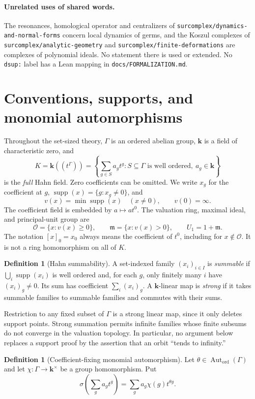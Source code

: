 \documentclass[11pt,oneside]{article}
\numberwithin{equation}{section}
\theoremstyle{definition}
\newtheorem{definition}[theorem]{Definition}
\theoremstyle{remark}
\newcommand{\kk}{\mathbf k}
\newcommand{\OO}{\mathcal O}
\newcommand{\mm}{\mathfrak m}
\newcommand{\supp}{\operatorname{supp}}
\newcommand{\Aut}{\operatorname{Aut}}
\newcommand{\repo}[1]{\nolinkurl{#1}}%
\begin{document}
\paragraph{Unrelated uses of shared words.} The resonances, homological
operator and centralizers of \repo{surcomplex/dynamics-and-normal-forms}
concern local dynamics of germs, and the Koszul complexes of
\repo{surcomplex/analytic-geometry} and \repo{surcomplex/finite-deformations}
are complexes of polynomial ideals. No statement there is used or extended.
No \texttt{dsup:} label has a Lean mapping in \repo{docs/FORMALIZATION.md}.

\section{Conventions, supports, and monomial automorphisms}\label{dsup:sec:setup}

Throughout the set-sized theory, $\Gamma$ is an ordered abelian group,
$\kk$ is a field of characteristic zero, and
\[
 K=\kk((t^\Gamma))
 =\left\{\sum_{g\in S}a_gt^g:S\subseteq\Gamma
       \text{ is well ordered},\ a_g\in\kk\right\}
\]
is the \emph{full} Hahn field. Zero coefficients can be omitted. We write
$x_g$ for the coefficient at $g$, $\supp(x)=\{g:x_g\ne0\}$, and
\[
 v(x)=\min\supp(x)\quad(x\ne0),\qquad v(0)=\infty.
\]
The coefficient field is embedded by $a\mapsto at^0$. The valuation ring,
maximal ideal, and principal-unit group are
\[
 \OO=\{x:v(x)\ge0\},\qquad
 \mm=\{x:v(x)>0\},\qquad U_1=1+\mm.
\]
The notation $[x]_0=x_0$ always means the coefficient of $t^0$, including
for $x\notin\OO$. It is not a ring homomorphism on all of $K$.

\begin{definition}[Hahn summability]
A set-indexed family $(x_i)_{i\in I}$ is \emph{summable} if
$\bigcup_i\supp(x_i)$ is well ordered and, for each $g$, only finitely many
$i$ have $(x_i)_g\ne0$. Its sum has coefficient
$\sum_i(x_i)_g$. A $\kk$-linear map is \emph{strong} if it takes summable
families to summable families and commutes with their sums.
\end{definition}

Restriction to any fixed subset of $\Gamma$ is a strong linear map, since
it only deletes support points. Strong summation permits infinite families
whose finite subsums do not converge in the valuation topology. In
particular, no argument below replaces a support proof by the assertion
that an orbit ``tends to infinity.''

\begin{definition}[Coefficient-fixing monomial automorphism]
Let $\theta\in\Aut_{\mathrm{ord}}(\Gamma)$ and let
$\chi:\Gamma\to\kk^\times$ be a group homomorphism. Put
\begin{equation}\label{dsup:eq:sigma}
 \sigma\left(\sum_g a_gt^g\right)
   =\sum_g a_g\chi(g)t^{\theta g}.
\end{equation}
\end{definition}
\end{document}
